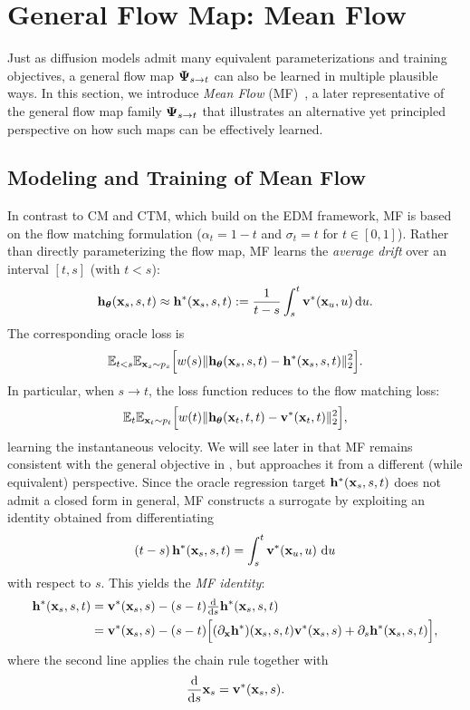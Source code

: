 \newpage

\section{\texorpdfstring{General Flow Map: Mean Flow}{General Flow Map: Mean Flow}}\label{sec:MF}


Just as diffusion models admit many equivalent parameterizations and training objectives, a general flow map ${\bm{\Psi}}_{s\to t}$ can also be learned in multiple plausible ways.  
In this section, we introduce \emph{Mean Flow} (MF)~\citep{geng2025mean}, a later representative of the general flow map family ${\bm{\Psi}}_{s\to t}$ that illustrates an alternative yet principled perspective on how such maps can be effectively learned.



\subsection{Modeling and Training of Mean Flow}

In contrast to CM and CTM, which build on the EDM framework, MF is based on the 
flow matching formulation ($\alpha_t = 1-t$ and $\sigma_t  = t$ for $t\in[0,1]$). 
Rather than directly parameterizing the flow map, MF learns the \emph{average drift}
over an interval $[t,s]$ (with $t<s$):
\[
{\mathbf{h}}_{{\bm{\theta}}}({\mathbf{x}}_s, s, t)  \approx 
{\mathbf{h}}^*({\mathbf{x}}_s, s, t) := \frac{1}{t-s}\int_s^t {\mathbf{v}}^*({\mathbf{x}}_u,u) \mathop{}\!\mathrm{d} u.
\]
The corresponding oracle loss is
\begin{align}\label{eq:mf-oracle}
\mathbb{E}_{t<s} \mathbb{E}_{{\mathbf{x}}_s\sim p_s}\Big[w(s) 
\|{\mathbf{h}}_{{\bm{\theta}}}({\mathbf{x}}_s,s,t) - {\mathbf{h}}^*({\mathbf{x}}_s,s,t)\|_2^2\Big].
\end{align}
In particular, when $s \to t$, the loss function reduces to the flow matching loss:
\begin{align}\label{eq:mf-to-fm}
    \mathbb{E}_{t} \mathbb{E}_{{\mathbf{x}}_t\sim p_t}\Big[w(t) 
\|{\mathbf{h}}_{{\bm{\theta}}}({\mathbf{x}}_t,t,t) - {\mathbf{v}}^*({\mathbf{x}}_t,t)\|_2^2\Big],
\end{align}
learning the instantaneous velocity.
We will see later in  that MF remains consistent with the 
general objective in , 
but approaches it from a different (while equivalent) perspective.
Since the oracle regression target ${\mathbf{h}}^*({\mathbf{x}}_s,s,t)$ does not admit a closed form in general, MF constructs a surrogate by exploiting an identity obtained from differentiating
\[
(t-s)\,{\mathbf{h}}^*({\mathbf{x}}_s,s,t) = \int_s^t {\mathbf{v}}^*({\mathbf{x}}_u,u)\,\mathop{}\!\mathrm{d} u
\]
with respect to $s$. This yields the \emph{MF identity}:
\begin{align}\label{eq:mf-identity}
\begin{aligned}
    {\mathbf{h}}^*({\mathbf{x}}_s,s,t)
&= {\mathbf{v}}^*({\mathbf{x}}_s,s) - (s-t) \tfrac{\mathop{}\!\mathrm{d}}{\mathop{}\!\mathrm{d} s}{\mathbf{h}}^*({\mathbf{x}}_s,s,t) \\
&= {\mathbf{v}}^*({\mathbf{x}}_s,s) - (s-t)\Big[(\partial_{{\mathbf{x}}}{\mathbf{h}}^*)({\mathbf{x}}_s,s,t) {\mathbf{v}}^*({\mathbf{x}}_s,s) 
+ \partial_s {\mathbf{h}}^*({\mathbf{x}}_s,s,t)\Big],
\end{aligned}
\end{align}
where the second line applies the chain rule together with 
\[
\frac{\mathop{}\!\mathrm{d}}{\mathop{}\!\mathrm{d} s}{\mathbf{x}}_s = {\mathbf{v}}^*({\mathbf{x}}_s,s).
\]

